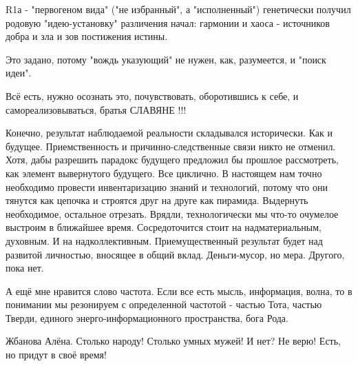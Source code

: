 \begin{itemize}
R1а - "первогеном вида" ("не избранный", а "исполненный") генетически получил
родовую "идею-установку" различения начал: гармонии и хаоса - источников добра
и зла и зов постижения истины.

Это задано, потому "вождь указующий" не нужен, как, разумеется, и "поиск идеи".

Всё есть, нужно осознать это, почувствовать, оборотившись к себе, и
самореализовываться, братья СЛАВЯНЕ !!!

 

Конечно, результат наблюдаемой реальности складывался исторически. Как и
будущее. Приемственность и причинно-следственные связи никто не отменил. Хотя,
дабы разрешить парадокс будущего предложил бы прошлое рассмотреть, как элемент
вывернутого будущего. Все циклично. В настоящем нам точно необходимо провести
инвентаризацию знаний и технологий, потому что они тянутся как цепочка и
строятся друг на друге как пирамида. Выдернуть необходимое, остальное отрезать.
Врядли, технологически мы что-то очумелое выстроим в ближайшее время.
Сосредоточится стоит на надматериальным, духовным. И на надколлективным.
Приемущественный результат будет над развитой личностью, вносящее в общий
вклад. Деньги-мусор, но мера. Другого, пока нет.


 

А ещё мне нравится слово частота. Если все есть мысль, информация, волна, то в
понимании мы резонируем с определенной частотой - частью Тота, частью Тверди,
единого энерго-информационного пространства, бога Рода.


 

Жбанова Алёна.
Столько народу! Столько умных мужей! И нет? Не верю! Есть, но придут в своё время!

 


\end{itemize}

